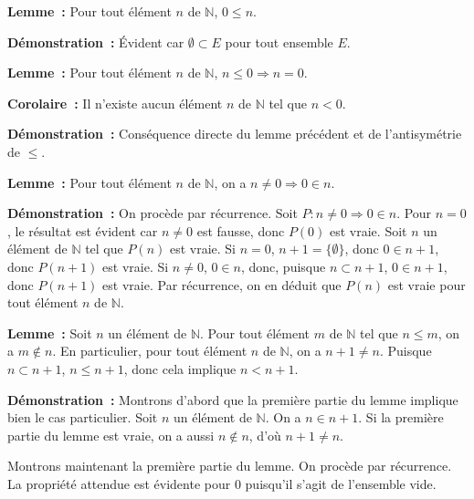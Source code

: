 \noindent\textbf{Lemme :} Pour tout élément $n$ de $\mathbb{N}$, $0 \leq n$.

\medskip

\noindent\textbf{Démonstration :} Évident car $\emptyset \subset E$ pour tout ensemble $E$. 

   \done 

\noindent\textbf{Lemme :} Pour tout élément $n$ de $\mathbb{N}$, $n \leq 0 \Rightarrow n = 0$.

\medskip

\noindent\textbf{Corolaire :} Il n'existe aucun élément $n$ de $\mathbb{N}$ tel que $n < 0$.

\medskip

\noindent\textbf{Démonstration :} Conséquence directe du lemme précédent et de l'antisymétrie de $\leq$. 

   \done 

\medskip

\noindent\textbf{Lemme :} Pour tout élément $n$ de $\mathbb{N}$, on a $n \neq 0 \Rightarrow 0 \in n$.

\medskip

\noindent\textbf{Démonstration :} 
    On procède par récurrence. 
    Soit $P: n \neq 0 \Rightarrow 0 \in n$.
    Pour $n = 0$, le résultat est évident car $n \neq 0$ est fausse, donc $P(0)$ est vraie. 
    Soit $n$ un élément de $\mathbb{N}$ tel que $P(n)$ est vraie. 
    Si $n = 0$, $n+1 = \lbrace \emptyset \rbrace$, donc $0 \in n+1$, donc $P(n+1)$ est vraie.
    Si $n \neq 0$, $0 \in n$, donc, puisque $n \subset n+1$, $0 \in n+1$, donc $P(n+1)$ est vraie.
    Par récurrence, on en déduit que $P(n)$ est vraie pour tout élément $n$ de $\mathbb{N}$.

   \done 

\medskip

\noindent\textbf{Lemme :} 
    Soit $n$ un élément de $\mathbb{N}$. 
    Pour tout élément $m$ de $\mathbb{N}$ tel que $n \leq m$, on a $m \notin n$.
    En particulier, pour tout élément $n$ de $\mathbb{N}$, on a $n+1 \neq n$. 
    Puisque $n \subset n+1$, $n \leq n+1$, donc cela implique $n < n+1$. 

\medskip

\noindent\textbf{Démonstration :} 
    Montrons d'abord que la première partie du lemme implique bien le cas particulier. 
    Soit $n$ un élément de $\mathbb{N}$. 
    On a $n \in n+1$. 
    Si la première partie du lemme est vraie, on a aussi $n \notin n$, d'où $n+1 \neq n$.

    Montrons maintenant la première partie du lemme. 
    On procède par récurrence. 
    La propriété attendue est évidente pour $0$ puisqu'il s'agit de l'ensemble vide. 

